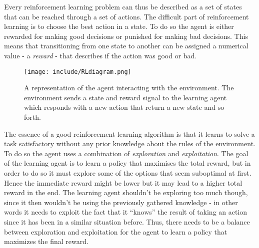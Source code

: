 \documentclass[11pt]{article}
\begin{document}
Every reinforcement learning problem can thus be described as a set of states that can be reached
through a set of actions.
The difficult part of reinforcement learning is to choose the best action in a
state.
To do so the agent is either rewarded for making good decisions or punished for making bad decisions.
This means that transitioning from one state to another can be assigned a numerical value
- a \textit{reward} - that describes if the action was good or bad.

\begin{figure}[!h]
    \centering
    \texttt{[image: include/RLdiagram.png]}
    \caption{A representation of the agent interacting with the environment.
        The environment sends a state and reward signal to the
    learning agent which responds with a new action that return a new state and so forth.}
    \label{fig:agent_environment}
\end{figure}

The essence of a good reinforcement learning algorithm is that it learns 
to solve a task satisfactory without any prior knowledge about the rules of the environment.
To do so the agent uses a combination of \textit{exploration} and \textit{exploitation}.
The goal of the learning agent is to learn a policy that maximises the total reward, but in order to do
so it must explore some of the options that seem suboptimal at first.
Hence the immediate reward might be lower but it may lead to a higher total reward in the end.
The learning agent shouldn't be exploring too much though, since it then wouldn't
be using the previously gathered knowledge - in other words it needs to
exploit the fact that it “knows” the result of taking an action since it has been in
a similar situation before.
Thus, there needs to be a balance between exploration and exploitation for the
agent to learn a policy that maximizes the final reward.
\end{document}

